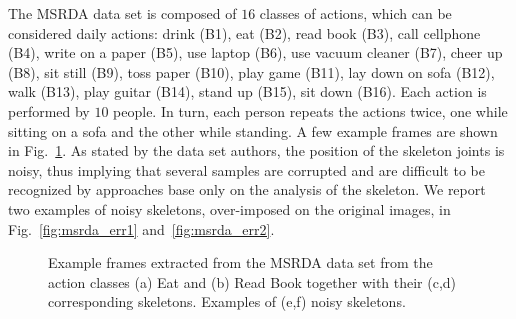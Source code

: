 \documentclass[runningheads,a4paper]{llncs}
\begin{document}
The MSRDA data set is composed of $16$ classes of actions, which can be considered daily actions: drink (B1), eat (B2), read book (B3), call cellphone (B4), write on a paper (B5), use laptop (B6), use vacuum cleaner (B7), cheer up (B8), sit still (B9), toss paper (B10), play game (B11), lay down on sofa (B12), walk (B13), play guitar (B14), stand up (B15), sit down (B16). 
Each action is performed by $10$ people. In turn, each person repeats the actions twice, one while sitting on a sofa and the other while standing. A few example frames are shown in Fig.~\ref{fig:dataset_msrda}.
As stated by the data set authors, the position of the skeleton joints is  noisy, thus implying that several samples are corrupted and are difficult to be recognized by approaches base only on the analysis of the skeleton. We report two examples of noisy skeletons, over-imposed on the original images, in Fig.~\ref{fig:msrda_err1} and~\ref{fig:msrda_err2}.

\begin{figure}[!t]
   \centering
             \setlength{\unitlength}{35mm}



   \caption{Example frames extracted from the MSRDA data set from the action classes (a) Eat  and  (b) Read Book together with their (c,d) corresponding skeletons. Examples of (e,f) noisy skeletons.}
   \label{fig:dataset_msrda}
\end{figure}
\end{document}
